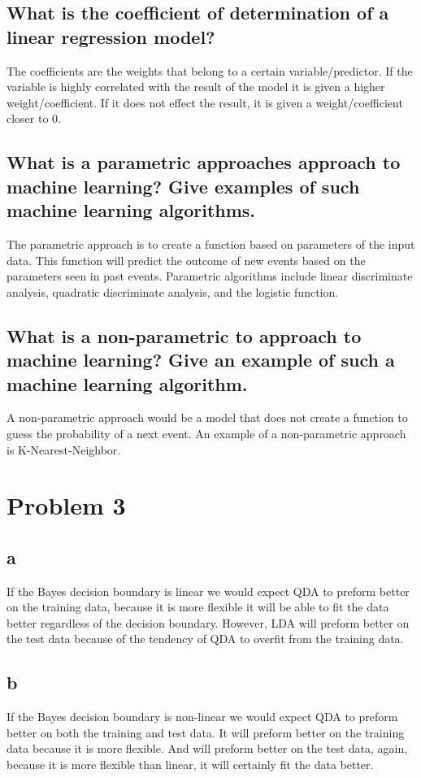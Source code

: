 \documentclass{article}
\begin{document}
\subsection*{What is the coefficient of determination of a linear regression model?}
The coefficients are the weights that belong to a certain variable/predictor. If the variable is highly correlated with the result of the model it is given a higher weight/coefficient. If it does not effect the result, it is given a weight/coefficient closer to 0.\\

\subsection*{What is a parametric approaches approach to machine learning? Give examples of such machine learning algorithms.}
The parametric approach is to create a function based on parameters of the input data. This function will predict the outcome of new events based on the parameters seen in past events. Parametric algorithms include linear discriminate analysis, quadratic discriminate analysis, and the logistic function.\\

\subsection*{What is a non-parametric to approach to machine learning? Give an example of such a machine learning algorithm.}
A non-parametric approach would be a model that does not create a function to guess the probability of a next event. An example of a non-parametric approach is K-Nearest-Neighbor.\\

\section*{Problem 3}
\subsection*{a}
If the Bayes decision boundary is linear we would expect QDA to preform better on the training data, because it is more flexible it will be able to fit the data better regardless of the decision boundary. However, LDA will preform better on the test data because of the tendency of QDA to overfit from the training data.\\
\subsection*{b}
If the Bayes decision boundary is non-linear we would expect QDA to preform better on both the training and test data. It will preform better on the training data because it is more flexible. And will preform better on the test data, again, because it is more flexible than linear, it will certainly fit the data better.\\
\end{document}
